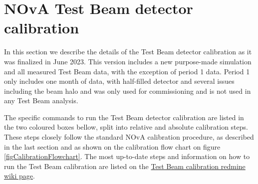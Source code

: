 \documentclass[12pt,a4paper]{article}
\begin{document}
\FloatBarrier
\newpage

\section{NOvA Test Beam detector calibration}
In this section we describe the details of the Test Beam detector calibration as it was finalized in June 2023. This version includes a new purpose-made simulation and all measured Test Beam data, with the exception of period 1 data. Period 1 only includes one month of data, with half-filled detector and several issues including the beam halo \cite{NOVA-doc-41331} and was only used for commissioning and is not used in any Test Beam analysis. 

The specific commands to run the Test Beam detector calibration are listed in the two coloured boxes bellow, split into relative and absolute calibration steps. These steps closely follow the standard NOvA calibration procedure, as described in the last section and as shown on the calibration flow chart on figure \ref{figCalibrationFlowchart}. The most up-to-date steps and information on how to run the Test Beam calibration are listed on the \href{https://cdcvs.fnal.gov/redmine/projects/novaart/wiki/Test\_Beam\_Calibration\_Instructions}{Test Beam calibration redmine wiki page}.
\end{document}
